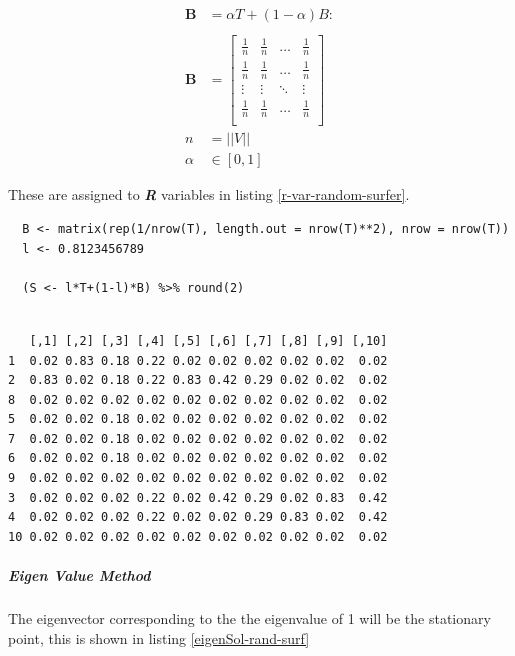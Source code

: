 \documentclass[11pt]{article}
\begin{document}
\begin{align}
    \mathbf{B} &= \alpha T +  \left( 1- \alpha \right)B :\\
\ \\
    \mathbf{B}&= \begin{bmatrix}
    \frac{1}{n} & \frac{1}{n} & \ldots & \frac{1}{n} \\
    \frac{1}{n} & \frac{1}{n} & \ldots & \frac{1}{n} \\
        \vdots      & \vdots      & \ddots & \vdots  \\
    \frac{1}{n} & \frac{1}{n} & \ldots & \frac{1}{n} \\
    \end{bmatrix} \label{eq:bgval1} \\
    n&= \left| \left| V \right| \right| \\
    \alpha &\in [0,1]
\end{align}

These are
assigned to \emph{\textbf{R}} variables in listing \ref{r-var-random-surfer}.

\begin{lstlisting}
  B <- matrix(rep(1/nrow(T), length.out = nrow(T)**2), nrow = nrow(T))
  l <- 0.8123456789

  (S <- l*T+(1-l)*B) %>% round(2)


\end{lstlisting}

\begin{verbatim}
   [,1] [,2] [,3] [,4] [,5] [,6] [,7] [,8] [,9] [,10]
1  0.02 0.83 0.18 0.22 0.02 0.02 0.02 0.02 0.02  0.02
2  0.83 0.02 0.18 0.22 0.83 0.42 0.29 0.02 0.02  0.02
8  0.02 0.02 0.02 0.02 0.02 0.02 0.02 0.02 0.02  0.02
5  0.02 0.02 0.18 0.02 0.02 0.02 0.02 0.02 0.02  0.02
7  0.02 0.02 0.18 0.02 0.02 0.02 0.02 0.02 0.02  0.02
6  0.02 0.02 0.18 0.02 0.02 0.02 0.02 0.02 0.02  0.02
9  0.02 0.02 0.02 0.02 0.02 0.02 0.02 0.02 0.02  0.02
3  0.02 0.02 0.02 0.22 0.02 0.42 0.29 0.02 0.83  0.42
4  0.02 0.02 0.02 0.22 0.02 0.02 0.29 0.83 0.02  0.42
10 0.02 0.02 0.02 0.02 0.02 0.02 0.02 0.02 0.02  0.02
\end{verbatim}
\subparagraph{Eigen Value Method}
\label{eigen-value-method}
The eigenvector corresponding to the the eigenvalue of 1 will be the
stationary point, this is shown in listing \ref{eigenSol-rand-surf}
\end{document}

